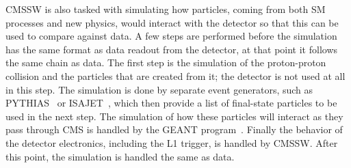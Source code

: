 CMSSW is also tasked with simulating how particles, coming from both SM processes and new physics, would interact with the detector so that this can be used to
compare against data. A few steps are performed before the simulation has the same format as data readout from the detector, at that
point it follows the same chain as data. The first step is the simulation of the proton-proton collision
and the particles that are created from it; the detector is not used at all in this step. 
The simulation is done by separate event generators, such as PYTHIAS~\cite{Sjostrand:2007gs} or ISAJET~\cite{Paige:2003mg},
which then provide a list of final-state particles to be used in the next step.
The simulation of how these particles will interact as they pass through CMS is handled by the GEANT program~\cite{Lefebure:1999wja}.
Finally the behavior of the detector electronics, including the L1 trigger, is handled by CMSSW.
After this point, the simulation is handled the same as data.
